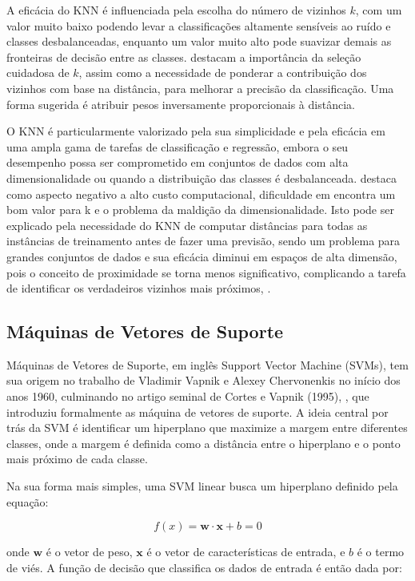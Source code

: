 A eficácia do KNN é influenciada pela escolha do número de vizinhos $k$, com um valor muito baixo podendo levar a classificações altamente sensíveis ao ruído e classes desbalanceadas, enquanto um valor muito alto pode suavizar demais as fronteiras de decisão entre as classes.  \cite{bhavani2021review} destacam a importância da seleção cuidadosa de $k$, assim como a necessidade de ponderar a contribuição dos vizinhos com base na distância, para melhorar a precisão da classificação.  Uma forma sugerida é atribuir pesos inversamente proporcionais à distância.


O KNN é particularmente valorizado pela sua simplicidade e pela eficácia em uma ampla gama de tarefas de classificação e regressão, embora o seu desempenho possa ser comprometido em conjuntos de dados com alta dimensionalidade ou quando a distribuição das classes é desbalanceada. \cite{kowsari2019text} destaca como aspecto negativo a alto custo computacional, dificuldade em encontra um bom valor para k e o problema da maldição da dimensionalidade.  Isto pode ser explicado pela necessidade do KNN de computar distâncias para todas as instâncias de treinamento antes de fazer uma previsão, sendo um problema para grandes conjuntos de dados e sua eficácia diminui em espaços de alta dimensão, pois o conceito de proximidade se torna menos significativo, complicando a tarefa de identificar os verdadeiros vizinhos mais próximos, \cite{hastie2009elements}.

\subsection{Máquinas de Vetores de Suporte}

Máquinas de Vetores de Suporte, em inglês Support Vector Machine (SVMs), tem sua origem no trabalho de Vladimir Vapnik e Alexey Chervonenkis no início dos anos 1960, culminando no artigo seminal de Cortes e Vapnik (1995), \cite{cortes1995support}, que introduziu formalmente as máquina de vetores de suporte. A ideia central por trás da SVM é identificar um hiperplano que maximize a margem entre diferentes classes, onde a margem é definida como a distância entre o hiperplano e o ponto mais próximo de cada classe.

Na sua forma mais simples, uma SVM linear busca um hiperplano definido pela equação:

\[
f(x) = \mathbf{w} \cdot \mathbf{x} + b = 0
\]

onde \(\mathbf{w}\) é o vetor de peso, \(\mathbf{x}\) é o vetor de características de entrada, e \(b\) é o termo de viés. A função de decisão que classifica os dados de entrada é então dada por:

